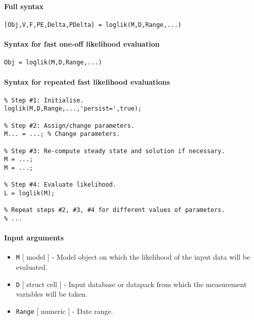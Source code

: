 


	\paragraph{Full syntax}\label{full-syntax}

\begin{verbatim}
[Obj,V,F,PE,Delta,PDelta] = loglik(M,D,Range,...)
\end{verbatim}

\paragraph{Syntax for fast one-off likelihood
evaluation}\label{syntax-for-fast-one-off-likelihood-evaluation}

\begin{verbatim}
Obj = loglik(M,D,Range,...)
\end{verbatim}

\paragraph{Syntax for repeated fast likelihood
evaluations}\label{syntax-for-repeated-fast-likelihood-evaluations}

\begin{verbatim}
% Step #1: Initialise.
loglik(M,D,Range,...,'persist=',true);

% Step #2: Assign/change parameters.
M... = ...; % Change parameters.

% Step #3: Re-compute steady state and solution if necessary.
M = ...;
M = ...;

% Step #4: Evaluate likelihood.
L = loglik(M);

% Repeat steps #2, #3, #4 for different values of parameters.
% ...
\end{verbatim}

\paragraph{Input arguments}\label{input-arguments}

\begin{itemize}
\item
  \texttt{M} {[} model {]} - Model object on which the likelihood of the
  input data will be evaluated.
\item
  \texttt{D} {[} struct \textbar{} cell {]} - Input database or datapack
  from which the measurement variables will be taken.
\item
  \texttt{Range} {[} numeric {]} - Date range.
\end{itemize}

